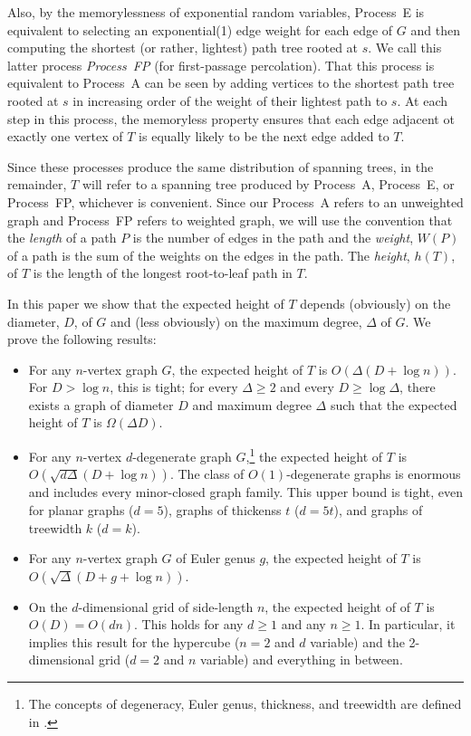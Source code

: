 \documentclass[lotsofwhite]{patmorin}
\begin{document}
Also, by the memorylessness of exponential random variables, Process~E
is equivalent to selecting an exponential(1) edge weight for each edge
of $G$ and then computing the shortest (or rather, lightest) path
tree rooted at $s$.  We call this latter process \emph{Process~FP}
(for first-passage percolation).  That this process is equivalent to
Process~A can be seen by adding vertices to the shortest path tree rooted
at $s$ in increasing order of the weight of their lightest path to $s$.
At each step in this process, the memoryless property ensures that each
edge adjacent ot exactly one vertex of $T$ is equally likely to be the
next edge added to $T$.

Since these processes produce the same distribution of spanning trees, in
the remainder, $T$ will refer to a spanning tree produced by Process~A,
Process~E, or Process~FP, whichever is convenient.  Since our Process~A
refers to an unweighted graph and Process~FP refers to weighted graph,
we will use the convention that the \emph{length} of a path $P$ is the
number of edges in the path and the \emph{weight}, $W(P)$ of a path
is the sum of the weights on the edges in the path. The \emph{height},
$h(T)$, of $T$ is the length of the longest root-to-leaf path in $T$.

In this paper we show that the expected height of $T$ depends (obviously)
on the diameter, $D$, of $G$ and (less obviously) on the maximum degree,
$\Delta$ of $G$.  We prove the following results:

\begin{itemize}
  \item For any $n$-vertex graph $G$, the expected height of $T$ is
  $O(\Delta(D+\log n))$.  For $D>\log n$, this is tight; for every
  $\Delta\ge 2$ and every $D \ge \log\Delta$, there exists a graph of
  diameter $D$ and maximum degree $\Delta$ such that the expected height
  of $T$ is $\Omega(\Delta D)$.

  \item For any $n$-vertex $d$-degenerate graph $G$,\footnote{The concepts
  of degeneracy, Euler genus, thickness, and treewidth are defined in .} the expected height
  of $T$ is $O(\sqrt{d\Delta}(D+\log n))$.  The class of $O(1)$-degenerate
  graphs is enormous and includes every minor-closed graph family.
  This upper bound is tight, even for planar graphs ($d=5$), graphs of
  thickenss $t$ ($d=5t$), and graphs of treewidth $k$ ($d=k$).

  \item For any $n$-vertex graph $G$ of Euler genus $g$, the expected height
    of $T$ is $O(\sqrt{\Delta}(D+g+\log n))$.

  \item On the $d$-dimensional grid of side-length $n$, the expected
    height of of $T$ is $O(D)=O(dn)$. This holds for any $d\ge 1$ and any
    $n\ge 1$. In particular, it implies this result for the hypercube
    ($n=2$ and $d$ variable) and the 2-dimensional grid ($d=2$ and $n$
    variable) and everything in between.
\end{itemize}
\end{document}
